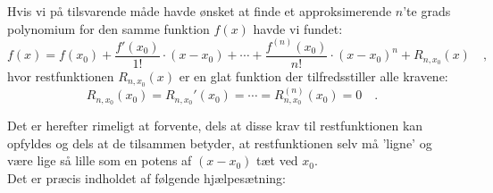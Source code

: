 Hvis vi på tilsvarende måde havde ønsket at finde et approksimerende $n$'te grads polynomium for den samme funktion $f(x)$ havde vi fundet:
\begin{equation}
f(x) = f(x_{0}) + \frac{f'(x_{0})}{1!}\cdot(x-x_{0}) + \cdots +
\frac{f^{(n)}(x_{0})}{n!}\cdot(x-x_{0})^{n} + R_{n, x_{0}}(x) \quad,
\end{equation}
hvor restfunktionen $R_{n, x_{0}}(x)$ er en glat funktion der tilfredsstiller alle kravene:
\begin{equation} \label{eqRestfkt}
R_{n, x_{0}}(x_{0}) = R_{n, x_{0}}'(x_{0}) = \cdots = R_{n, x_{0}}^{(n)}(x_{0})= 0 \quad.
\end{equation}

Det er herefter rimeligt at forvente, dels at disse krav til restfunktionen kan opfyldes og dels at de tilsammen betyder, at restfunktionen selv må 'ligne' og være lige så lille som en potens
af $(x-x_{0})$ tæt ved $x_{0}$. \\

Det er præcis indholdet af følgende hjælpesætning:

